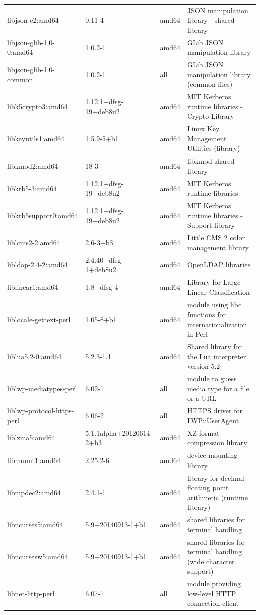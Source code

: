 \documentclass[a4paper,10pt]{article}
\begin{document}
\begin{appendices}
{\begin{longtable}{p{3.25cm}@{\hspace{0.25cm}}p{4cm}@{\hspace{0.25cm}}l@{\hspace{0.25cm}}p{7cm}}
libjson-c2:amd64	&	0.11-4	&	amd64	&	JSON manipulation library - shared library	\\
libjson-glib-1.0-0:amd64	&	1.0.2-1	&	amd64	&	GLib JSON manipulation library	\\
libjson-glib-1.0-common	&	1.0.2-1	&	all	&	GLib JSON manipulation library (common files)	\\
libk5crypto3:amd64	&	1.12.1+dfsg-19+deb8u2	&	amd64	&	MIT Kerberos runtime libraries - Crypto Library	\\
libkeyutils1:amd64	&	1.5.9-5+b1	&	amd64	&	Linux Key Management Utilities (library)	\\
libkmod2:amd64	&	18-3	&	amd64	&	libkmod shared library	\\
libkrb5-3:amd64	&	1.12.1+dfsg-19+deb8u2	&	amd64	&	MIT Kerberos runtime libraries	\\
libkrb5support0:amd64	&	1.12.1+dfsg-19+deb8u2	&	amd64	&	MIT Kerberos runtime libraries - Support library	\\
liblcms2-2:amd64	&	2.6-3+b3	&	amd64	&	Little CMS 2 color management library	\\
libldap-2.4-2:amd64	&	2.4.40+dfsg-1+deb8u2	&	amd64	&	OpenLDAP libraries	\\
liblinear1:amd64	&	1.8+dfsg-4	&	amd64	&	Library for Large Linear Classification	\\
liblocale-gettext-perl	&	1.05-8+b1	&	amd64	&	module using libc functions for internationalization in Perl	\\
liblua5.2-0:amd64	&	5.2.3-1.1	&	amd64	&	Shared library for the Lua interpreter version 5.2	\\
liblwp-mediatypes-perl	&	6.02-1	&	all	&	module to guess media type for a file or a URL	\\
liblwp-protocol-https-perl	&	6.06-2	&	all	&	HTTPS driver for LWP::UserAgent	\\
liblzma5:amd64	&	5.1.1alpha+20120614-2+b3	&	amd64	&	XZ-format compression library	\\
libmount1:amd64	&	2.25.2-6	&	amd64	&	device mounting library	\\
libmpdec2:amd64	&	2.4.1-1	&	amd64	&	library for decimal floating point arithmetic (runtime library)	\\
libncurses5:amd64	&	5.9+20140913-1+b1	&	amd64	&	shared libraries for terminal handling	\\
libncursesw5:amd64	&	5.9+20140913-1+b1	&	amd64	&	shared libraries for terminal handling (wide character support)	\\
libnet-http-perl	&	6.07-1	&	all	&	module providing low-level HTTP connection client	\\

\end{longtable}}
\end{appendices}
\end{document}
